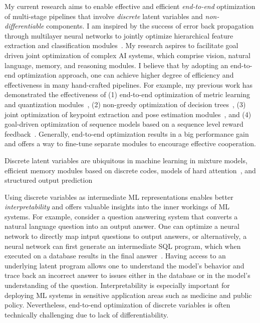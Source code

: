 \documentclass[a4paper, 10pt]{article}
\def\eg{{\em e.g.,}}
\newcommand{\figref}[1]{Figure~\ref{#1}}
\begin{document}

My current research aims to enable effective and efficient {\em
  end-to-end} optimization of multi-stage pipelines that involve {\em
  discrete} latent variables and {\em non-differentiable} components.
I am inspired by the success of error back propagation through
multilayer neural networks to jointly optimize hierarchical feature
extraction and classification modules~\cite{backprop,lecun98}.
My research aspires to facilitate goal driven joint optimization of
complex AI systems, which comprise vision, natural language, memory,
and reasoning modules. I believe that by adopting an end-to-end
optimization approach, one can achieve higher degree of efficiency and
effectiveness in many hand-crafted pipelines.  For example, my
previous work has demonstrated the effectiveness of (1) end-to-end
optimization of metric learning and quantization
modules~\cite{mlh,hdml}, (2) non-greedy optimization of decision
trees~\cite{engodt}, (3) joint optimization of keypoint extraction and
pose estimation modules~\cite{keypointnet}, and (4) goal-driven
optimization of sequence models based on a sequence level reward
feedback~\cite{mapo,ocd}. Generally, end-to-end optimization results
in a big performance gain and offers a way to fine-tune separate
modules to encourage effective cooperation.

Discrete latent variables are ubiquitous in machine learning in
mixture models, efficient memory modules based on discrete codes,
models of hard attention~\cite{hardattention}, and structured output
prediction~\cite{}

Using discrete variables as intermediate ML
representations enables better {\em interpretability} and offers
valuable insights into the inner workings of ML systems. For example,
consider a question answering system that converts a natural language
question into an output answer. One can optimize a neural network to
directly map intput questions to output answers, or alternatively, a
neural network can first generate an intermediate SQL program, which
when executed on a database results in the final
answer~\cite{mapo}. Having access to an underlying latent program
allows one to understand the model's behavior and trace back an
incorrect answer to issues either in the database or in the model's
understanding of the question. Interpretability is especially
important for deploying ML systems in sensitive application areas such
as medicine and public policy. Nevertheless, end-to-end optimization
of discrete variables is often technically challenging due to lack of
differentiability.
\end{document}
